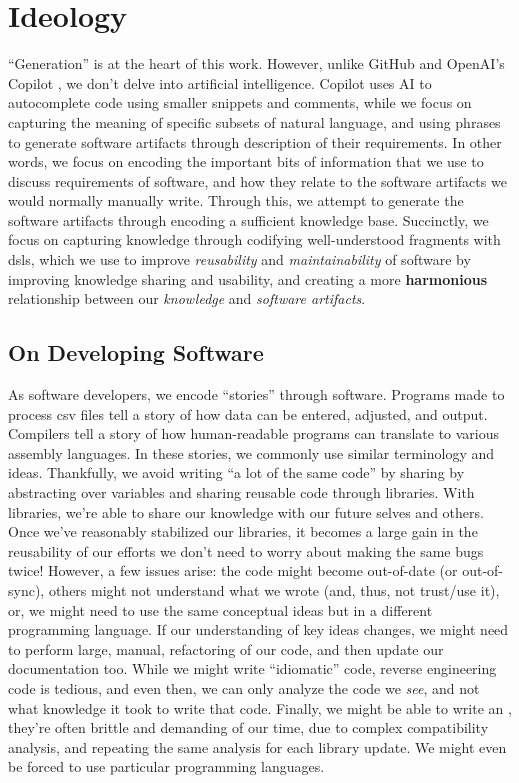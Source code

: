 \chapter[Ideology]{Ideology\footnotemark}
\label{chap:ideology}

``Generation'' is at the heart of this work. However, unlike GitHub and OpenAI's
Copilot \cite{Copilot}, we don't delve into artificial intelligence. Copilot
uses AI to autocomplete code using smaller snippets and comments, while we focus
on capturing the meaning of specific subsets of natural language, and using
phrases to generate software artifacts through description of their
requirements. In other words, we focus on encoding the important bits of
information that we use to discuss requirements of software, and how they relate
to the software artifacts we would normally manually write. Through this, we
attempt to generate the software artifacts through encoding a sufficient
knowledge base. Succinctly, we focus on capturing knowledge through codifying
well-understood fragments with \aclp{dsl}, which we use to improve
\textit{reusability} and \textit{maintainability} of software by improving
knowledge sharing and usability, and creating a more \textbf{harmonious}
relationship between our \textit{knowledge} and \textit{software artifacts}.

\section{On Developing Software}
\label{chap:ideology:sec:on_developing_software}

As software developers, we encode ``stories'' through software. Programs made to
process \acs{csv} files tell a story of how data can be entered, adjusted, and
output. Compilers tell a story of how human-readable programs can translate to
various assembly languages. In these stories, we commonly use similar
terminology and ideas. Thankfully, we avoid writing ``a lot of the same code''
by sharing by abstracting over variables and sharing reusable code through
libraries. With libraries, we're able to share our knowledge with our future
selves and others. Once we've reasonably stabilized our libraries, it becomes a
large gain in the reusability of our efforts \textemdash we don't need to worry
about making the same bugs twice! However, a few issues arise: the code might
become out-of-date (or out-of-sync), others might not understand what we wrote
(and, thus, not trust/use it), or, we might need to use the same conceptual
ideas but in a different programming language. If our understanding of key ideas
changes, we might need to perform large, manual, refactoring of our code, and
then update our documentation too. While we might write ``idiomatic'' code,
reverse engineering code is tedious, and even then, we can only analyze the code
we \textit{see}, and not what knowledge it took to write that code. Finally, we
might be able to write an , they're often brittle and demanding of our
time, due to complex compatibility analysis, and repeating the same analysis for
each library update. We might even be forced to use particular programming
languages.

